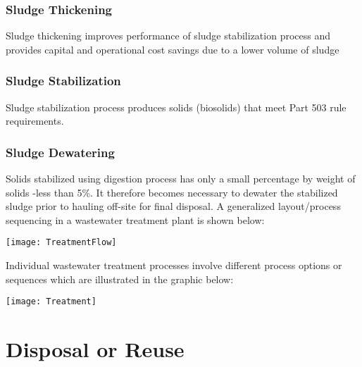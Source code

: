 \begin{itemize}
\subsubsection{Sludge Thickening}
Sludge thickening improves performance of sludge stabilization process and provides capital and operational cost savings due to a lower volume of sludge
\subsubsection{Sludge Stabilization}
Sludge stabilization process produces solids (biosolids) that meet Part 503 rule requirements. 
\subsubsection{Sludge Dewatering}
Solids stabilized using digestion process has only a small percentage by weight of solids -less than 5\%.  It therefore becomes necessary to dewater the stabilized sludge prior to hauling off-site for final disposal. 
\vspace{0.5cm}
A generalized layout/process sequencing in a wastewater treatment plant is shown below:
\begin{center}
\texttt{[image: TreatmentFlow]}
\end{center}
Individual wastewater treatment processes involve different process options or sequences which are illustrated in the graphic below:
\begin{center}
\texttt{[image: Treatment]}
\end{center}
\end{itemize}

\section{Disposal or Reuse}

